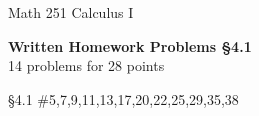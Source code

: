 \documentclass[11pt]{report}
\theoremstyle{plain}
\begin{document}
\hfill Math 251 Calculus I
\begin{center}
\Large{\textbf{Written Homework Problems \S 4.1}} \\
14 problems for 28 points\\
\end{center}

\begin{description}
\item{\S 4.1} \#5,7,9,11,13,17,20,22,25,29,35,38\\


\end{description}
\end{document}
